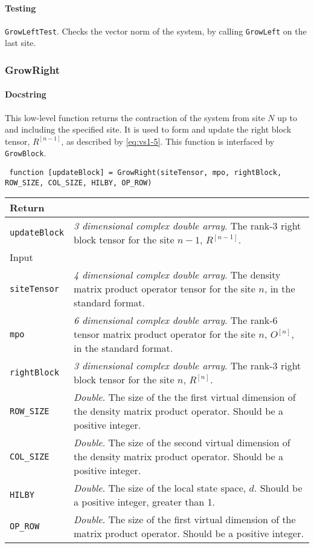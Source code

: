  \paragraph{Testing} \lstinline$GrowLeftTest$. Checks the vector norm of the system, by calling \lstinline$GrowLeft$ on the last site.
 
 \subsubsection{GrowRight}
 \paragraph{Docstring} This low-level function returns the contraction of the system from site \(N\) up to and including the specified site. It is used to form and update the right block tensor, \(R^{[n-1]}\), as described by \cref{eq:vs1-5}. This function is interfaced by \lstinline$GrowBlock$.
 \begin{lstlisting}
 function [updateBlock] = GrowRight(siteTensor, mpo, rightBlock, ROW_SIZE, COL_SIZE, HILBY, OP_ROW) \end{lstlisting}
 \begin{longtabu}{X[1,l]X[4,l]}
 \hline
 Return & \\ \hline
 \lstinline$updateBlock$ & \emph{3 dimensional complex double array}. The rank-3 right block tensor for the site \(n - 1\), \(R^{[n-1]}\). \\ \hline
 Input & \\ \hline
 \lstinline$siteTensor$ & \emph{4 dimensional complex double array}. The density matrix product operator tensor for the site \(n\), in the standard format. \\
 \lstinline$mpo$ & \emph{6 dimensional complex double array}. The rank-6 tensor matrix product operator for the site \(n\), \(O^{[n]}\), in the standard format. \\
 \lstinline$rightBlock$ & \emph{3 dimensional complex double array}. The rank-3 right block tensor for the site \(n\), \(R^{[n]}\). \\
 \lstinline$ROW_SIZE$ & \emph{Double}. The size of the the first virtual dimension of the density matrix product operator. Should be a positive integer. \\
 \lstinline$COL_SIZE$ & \emph{Double}. The size of the second virtual dimension of the density matrix product operator. Should be a positive integer. \\ 
 \lstinline$HILBY$ & \emph{Double}. The size of the local state space, \(d\). Should be a positive integer, greater than 1. \\
 \lstinline$OP_ROW$ & \emph{Double}. The size of the first virtual dimension of the matrix product operator. Should be a positive integer. \\
 \hline
 \end{longtabu}
